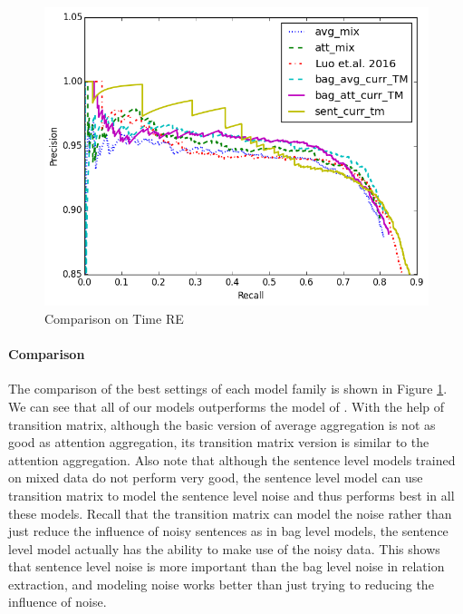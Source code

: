 \begin{figure}[htbp]
\begin{center}
\includegraphics[width=0.9\linewidth]{figures/best_cmp_exp_overall.png}
\caption{Comparison on Time RE}
\label{fig: cmp_luo}
\end{center}
\end{figure}

\paragraph{Comparison}
The comparison of the best settings of each model family is shown in Figure \ref{fig: cmp_luo}. We can see that all of our models outperforms the model of \cite{luo2016temporal}. With the help of transition matrix, although the basic version of average aggregation is not as good as attention aggregation, its transition matrix version is similar to the attention aggregation. Also note that although the sentence level models trained on mixed data do not perform very good, the sentence level model can use transition matrix to model the sentence level noise and thus performs best in all these models. Recall that the transition matrix can model the noise rather than just reduce the influence of noisy sentences as in bag level models, the sentence level model actually has the ability to make use of the noisy data. This shows that sentence level noise is more important than the bag level noise in relation extraction, and modeling noise works better than just trying to reducing the influence of noise.


